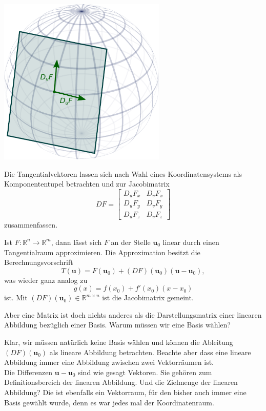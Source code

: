 \documentclass{beamer}
\newcommand{\R}{\mathbb R}
\begin{document}
\begin{frame}
\begin{center}
\includegraphics[width=0.6\textwidth]{img/Tangentialebene.pdf}
\end{center}
\end{frame}

\begin{frame}
Die Tangentialvektoren lassen sich nach Wahl eines
Koordinatensystems als Komponententupel betrachten und
zur Jacobimatrix
\[DF = \begin{bmatrix}
D_u F_x & D_v F_x\\
D_u F_y & D_v F_y\\
D_u F_z & D_v F_z
\end{bmatrix}\]
zusammenfassen.
\end{frame}

\begin{frame}
Ist $F\colon\R^n\to\R^m$, dann lässt sich $F$ an der Stelle
$\mathbf u_0$ linear durch einen Tangentialraum approximieren.
Die Approximation besitzt die Berechnungsvorschrift
\[T(\mathbf u) = F(\mathbf u_0)+(DF)(\mathbf u_0)(\mathbf u-\mathbf u_0),\]
was wieder ganz analog zu
\[g(x) = f(x_0)+f'(x_0)(x-x_0)\]
ist. Mit $(DF)(\mathbf u_0)\in\R^{m\times n}$ ist die Jacobimatrix
gemeint.
\end{frame}

\begin{frame}
Aber eine Matrix ist doch nichts anderes als die Darstellungsmatrix
einer linearen Abbildung bezüglich einer Basis. Warum müssen wir eine
Basis wählen?
\end{frame}

\begin{frame}
Klar, wir müssen natürlich keine Basis wählen und können die
Ableitung $(DF)(\mathbf u_0)$ als lineare Abbildung betrachten. Beachte aber
dass eine lineare Abbildung immer eine Abbildung zwischen zwei
Vektorräumen ist.\\[1em]
Die Differenzen $\mathbf u-\mathbf u_0$ sind wie gesagt Vektoren.
Sie gehören zum Definitionsbereich der linearen Abbildung. Und die
Zielmenge der linearen Abbildung? Die ist ebenfalls ein Vektorraum,
für den bisher auch immer eine Basis gewählt wurde, denn es war
jedes mal der Koordinatenraum.
\end{frame}
\end{document}
